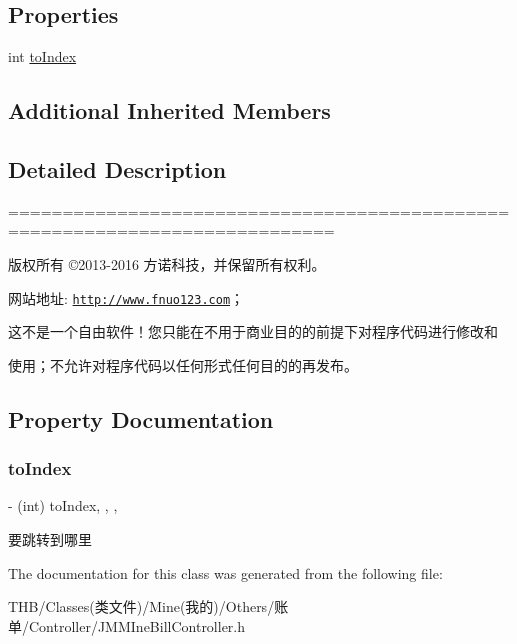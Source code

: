\subsection*{Properties}
\begin{DoxyCompactItemize}
\item 
int \mbox{\hyperlink{interface_j_m_m_ine_bill_controller_a4b9b210ca8b667e75b2d0629d5e86c36}{to\+Index}}
\end{DoxyCompactItemize}
\subsection*{Additional Inherited Members}


\subsection{Detailed Description}
============================================================================

版权所有 ©2013-\/2016 方诺科技，并保留所有权利。

网站地址\+: \href{http://www.fnuo123.com}{\tt http\+://www.\+fnuo123.\+com}； 



这不是一个自由软件！您只能在不用于商业目的的前提下对程序代码进行修改和

使用；不允许对程序代码以任何形式任何目的的再发布。 

 

\subsection{Property Documentation}
\mbox{\label{interface_j_m_m_ine_bill_controller_a4b9b210ca8b667e75b2d0629d5e86c36}} 
\subsubsection{\texorpdfstring{to\+Index}{toIndex}}
{\footnotesize\ttfamily -\/ (int) to\+Index\hspace{0.3cm}{\ttfamily [read]}, {\ttfamily [write]}, {\ttfamily [nonatomic]}, {\ttfamily [assign]}}

要跳转到哪里 

The documentation for this class was generated from the following file\+:\begin{DoxyCompactItemize}
\item 
T\+H\+B/\+Classes(类文件)/\+Mine(我的)/\+Others/账单/\+Controller/J\+M\+M\+Ine\+Bill\+Controller.\+h\end{DoxyCompactItemize}

